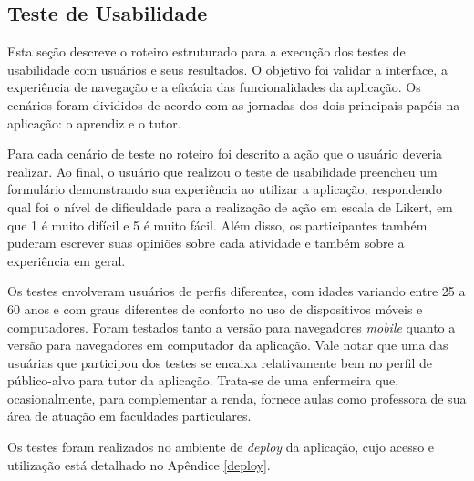 \terminarCabecalhoTabelaPaisagem

\subsection{Teste de Usabilidade}
Esta seção descreve o roteiro estruturado para a execução dos testes de usabilidade com usuários e seus resultados. O objetivo foi validar a interface, a experiência de navegação e a eficácia das funcionalidades da aplicação. Os cenários foram divididos de acordo com as jornadas dos dois principais papéis na aplicação: o aprendiz e o tutor.

Para cada cenário de teste no roteiro foi descrito a ação que o usuário deveria realizar. Ao final, o usuário que realizou o teste de usabilidade preencheu um formulário demonstrando sua experiência ao utilizar a aplicação, respondendo qual foi o nível de dificuldade para a realização de ação em escala de Likert, em que 1 é muito difícil e 5 é muito fácil. Além disso, os participantes também puderam escrever suas opiniões sobre cada atividade e também sobre a experiência em geral.

Os testes envolveram usuários de perfis diferentes, com idades variando entre 25 a 60 anos e com graus diferentes de conforto no uso de dispositivos móveis e computadores. Foram testados tanto a versão para navegadores \textit{mobile} quanto a versão para navegadores em computador da aplicação. Vale notar que uma das usuárias que participou dos testes se encaixa relativamente bem no perfil de público-alvo para tutor da aplicação. Trata-se de uma enfermeira que, ocasionalmente, para complementar a renda, fornece aulas como professora de sua área de atuação em faculdades particulares.

Os testes foram realizados no ambiente de \textit{deploy} da aplicação, cujo acesso e utilização está detalhado no Apêndice \ref{deploy}.


